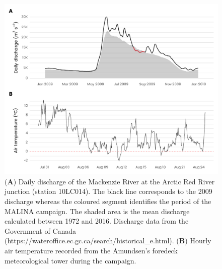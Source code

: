 \documentclass[essd, manuscript]{copernicus}
\begin{document}
\clearpage

\begin{figure}[H]
    \centering
    \includegraphics[scale = 1]{../../../graphs/fig02.pdf}
    \caption{(\textbf{A}) Daily discharge of the Mackenzie River at the Arctic Red River junction (station 10LC014). The black line corresponds to the 2009 discharge whereas the coloured segment identifies the period of the MALINA campaign. The shaded area is the mean discharge calculated between 1972 and 2016. Discharge data from the Government of Canada (https://wateroffice.ec.gc.ca/search/historical\_e.html). (\textbf{B}) Hourly air temperature recorded from the Amundsen's foredeck meteorological tower during the campaign.}
\end{figure}

\clearpage
\end{document}

